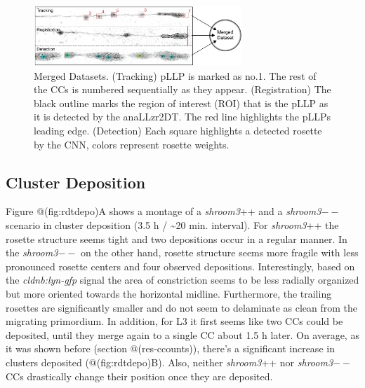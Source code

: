 \documentclass[11pt,singlespacinge,twoside]{reedthesis} %
\begin{document}
\begin{figure}

{\centering \includegraphics[width=0.7\textwidth]{figures/results/03_rosettes/RDT-01} 

}

\caption[RDT Merged Datasets]{Merged Datasets. (Tracking) pLLP is marked as no.1. The rest of the CCs is numbered sequentially as they appear. (Registration) The black outline marks the region of interest (ROI) that is the pLLP as it is detected by the anaLLzr2DT. The red line highlights the pLLPs leading edge. (Detection) Each square highlights a detected rosette by the CNN, colors represent rosette weights.}\label{fig:rdt}
\end{figure}
\hypertarget{cluster-deposition}{%
\subsection{Cluster Deposition}\label{cluster-deposition}}

Figure @(fig:rdtdepo)A shows a montage of a \emph{shroom3}++ and a \emph{shroom3}\(--\) scenario in cluster deposition (3.5 h / \textasciitilde{}20 min. interval). For \emph{shroom3}++ the rosette structure seems tight and two depositions occur in a regular manner. In the \emph{shroom3}\(--\) on the other hand, rosette structure seems more fragile with less pronounced rosette centers and four observed depositions. Interestingly, based on the \emph{cldnb:lyn-gfp} signal the area of constriction seems to be less radially organized but more oriented towards the horizontal midline. Furthermore, the trailing rosettes are significantly smaller and do not seem to delaminate as clean from the migrating primordium. In addition, for L3 it first seems like two CCs could be deposited, until they merge again to a single CC about 1.5 h later.
On average, as it was shown before (section @(res-ccounts)), there's a significant increase in clusters deposited (@(fig:rdtdepo)B). Also, neither \emph{shroom3}++ nor \emph{shroom3}\(--\) CCs drastically change their position once they are deposited.
\end{document}
